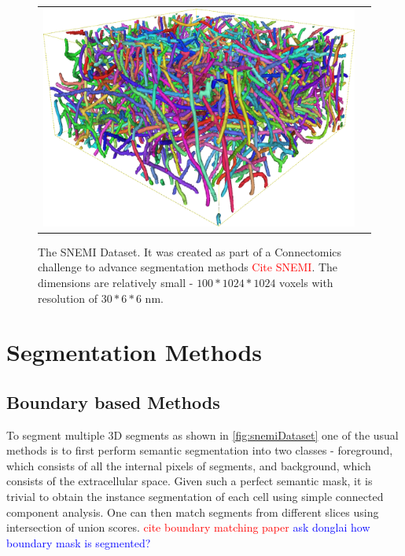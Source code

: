 \begin{figure}[htpb]
\begin{tabular}{XX}
	\includegraphics[height=\myheight,width=\mywidth,keepaspectratio]{data/images/snemiGlimpse/snemi3DSkelContext.png}\caption*{3D skeletons.}
  \end{tabular}
	\caption{The SNEMI Dataset. It was created as part of a Connectomics challenge to advance segmentation methods \textcolor{red}{Cite SNEMI}. The dimensions are relatively small - $100*1024*1024$ voxels with resolution of $30*6*6$ nm. }
	\label{fig:snemiDataset}
\end{figure}


\section{Segmentation Methods}

\subsection{Boundary based Methods}
To segment multiple 3D segments as shown in \autoref{fig:snemiDataset} one of the usual methods is to first perform semantic segmentation into two classes - foreground, which consists of all the internal pixels of segments, and background, which consists of the extracellular space. Given such a perfect semantic mask, it is trivial to obtain the instance segmentation of each cell using simple connected component analysis. One can then match segments from different slices using intersection of union scores. \textcolor{red}{cite boundary matching paper} \textcolor{blue}{ask donglai how boundary mask is segmented?}

